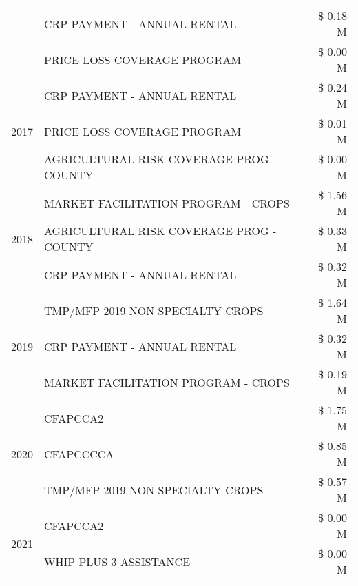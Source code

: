 \begin{tabular}{llr}
 & CRP PAYMENT - ANNUAL RENTAL                   & \$ 0.18 M \\
 & PRICE LOSS COVERAGE PROGRAM                   & \$ 0.00 M \\
\cline{1-3}
\multirow[t]{3}{*}{2017} & CRP PAYMENT - ANNUAL RENTAL & \$ 0.24 M \\
 & PRICE LOSS COVERAGE PROGRAM & \$ 0.01 M \\
 & AGRICULTURAL RISK COVERAGE PROG - COUNTY & \$ 0.00 M \\
\cline{1-3}
\multirow[t]{3}{*}{2018} & MARKET FACILITATION PROGRAM - CROPS & \$ 1.56 M \\
 & AGRICULTURAL RISK COVERAGE PROG - COUNTY & \$ 0.33 M \\
 & CRP PAYMENT - ANNUAL RENTAL & \$ 0.32 M \\
\cline{1-3}
\multirow[t]{3}{*}{2019} & TMP/MFP 2019 NON SPECIALTY CROPS & \$ 1.64 M \\
 & CRP PAYMENT - ANNUAL RENTAL & \$ 0.32 M \\
 & MARKET FACILITATION PROGRAM - CROPS & \$ 0.19 M \\
\cline{1-3}
\multirow[t]{3}{*}{2020} & CFAPCCA2 & \$ 1.75 M \\
 & CFAPCCCCA & \$ 0.85 M \\
 & TMP/MFP 2019 NON SPECIALTY CROPS & \$ 0.57 M \\
\cline{1-3}
\multirow[t]{2}{*}{2021} & CFAPCCA2 & \$ 0.00 M \\
 & WHIP PLUS 3 ASSISTANCE & \$ 0.00 M \\
\cline{1-3}
\bottomrule
\end{tabular}

